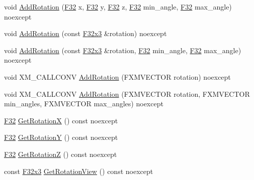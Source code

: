 \begin{DoxyCompactItemize}
\item 
void \mbox{\hyperlink{classmage_1_1_transform_a25cc97172b31c3d47cffcf3a6158a562}{Add\+Rotation}} (\mbox{\hyperlink{namespacemage_aa97e833b45f06d60a0a9c4fc22ae02c0}{F32}} x, \mbox{\hyperlink{namespacemage_aa97e833b45f06d60a0a9c4fc22ae02c0}{F32}} y, \mbox{\hyperlink{namespacemage_aa97e833b45f06d60a0a9c4fc22ae02c0}{F32}} z, \mbox{\hyperlink{namespacemage_aa97e833b45f06d60a0a9c4fc22ae02c0}{F32}} min\+\_\+angle, \mbox{\hyperlink{namespacemage_aa97e833b45f06d60a0a9c4fc22ae02c0}{F32}} max\+\_\+angle) noexcept
\item 
void \mbox{\hyperlink{classmage_1_1_transform_a1b32d3782084953e3630fea231e3facc}{Add\+Rotation}} (const \mbox{\hyperlink{namespacemage_a1e3c7a882af461f161caa1cbddaf1fa2}{F32x3}} \&rotation) noexcept
\item 
void \mbox{\hyperlink{classmage_1_1_transform_a7114cd014f43ea0354b7da4567149f19}{Add\+Rotation}} (const \mbox{\hyperlink{namespacemage_a1e3c7a882af461f161caa1cbddaf1fa2}{F32x3}} \&rotation, \mbox{\hyperlink{namespacemage_aa97e833b45f06d60a0a9c4fc22ae02c0}{F32}} min\+\_\+angle, \mbox{\hyperlink{namespacemage_aa97e833b45f06d60a0a9c4fc22ae02c0}{F32}} max\+\_\+angle) noexcept
\item 
void X\+M\+\_\+\+C\+A\+L\+L\+C\+O\+NV \mbox{\hyperlink{classmage_1_1_transform_ae131948e8d2c34d1207e2188f75a3e9f}{Add\+Rotation}} (F\+X\+M\+V\+E\+C\+T\+OR rotation) noexcept
\item 
void X\+M\+\_\+\+C\+A\+L\+L\+C\+O\+NV \mbox{\hyperlink{classmage_1_1_transform_a9c8549cd8ecd7b2105f7e40b4cd83501}{Add\+Rotation}} (F\+X\+M\+V\+E\+C\+T\+OR rotation, F\+X\+M\+V\+E\+C\+T\+OR min\+\_\+angles, F\+X\+M\+V\+E\+C\+T\+OR max\+\_\+angles) noexcept
\item 
\mbox{\hyperlink{namespacemage_aa97e833b45f06d60a0a9c4fc22ae02c0}{F32}} \mbox{\hyperlink{classmage_1_1_transform_ad3e1b49ccac234303ff28c8aea6f8e4a}{Get\+RotationX}} () const noexcept
\item 
\mbox{\hyperlink{namespacemage_aa97e833b45f06d60a0a9c4fc22ae02c0}{F32}} \mbox{\hyperlink{classmage_1_1_transform_ac1962d03093b3671fcfb6a9b4f410628}{Get\+RotationY}} () const noexcept
\item 
\mbox{\hyperlink{namespacemage_aa97e833b45f06d60a0a9c4fc22ae02c0}{F32}} \mbox{\hyperlink{classmage_1_1_transform_a1c2ae96eb6c0d33afd406ca1685b74f5}{Get\+RotationZ}} () const noexcept
\item 
const \mbox{\hyperlink{namespacemage_a1e3c7a882af461f161caa1cbddaf1fa2}{F32x3}} \mbox{\hyperlink{classmage_1_1_transform_ae1542afb8ef71242f9b082383106a19b}{Get\+Rotation\+View}} () const noexcept

\end{DoxyCompactItemize}
